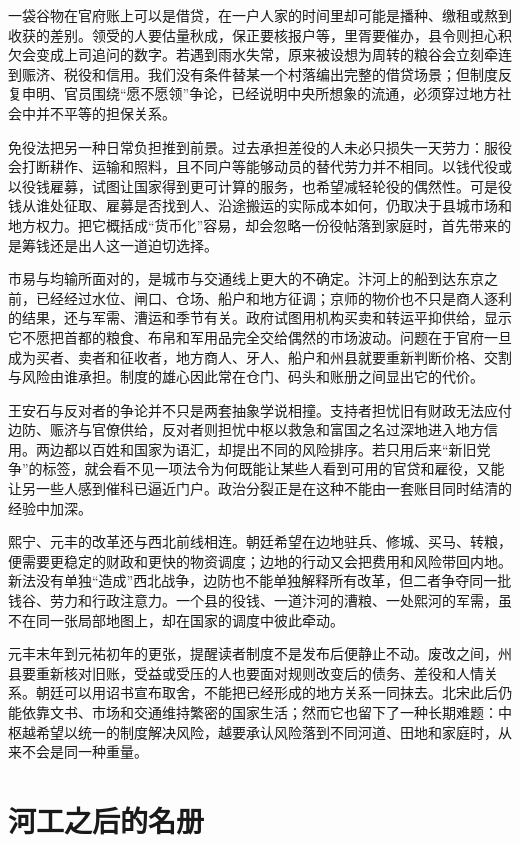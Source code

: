 一袋谷物在官府账上可以是借贷，在一户人家的时间里却可能是播种、缴租或熬到收获的差别。领受的人要估量秋成，保正要核报户等，里胥要催办，县令则担心积欠会变成上司追问的数字。若遇到雨水失常，原来被设想为周转的粮谷会立刻牵连到赈济、税役和信用。我们没有条件替某一个村落编出完整的借贷场景；但制度反复申明、官员围绕“愿不愿领”争论，已经说明中央所想象的流通，必须穿过地方社会中并不平等的担保关系。

免役法把另一种日常负担推到前景。过去承担差役的人未必只损失一天劳力：服役会打断耕作、运输和照料，且不同户等能够动员的替代劳力并不相同。以钱代役或以役钱雇募，试图让国家得到更可计算的服务，也希望减轻轮役的偶然性。可是役钱从谁处征取、雇募是否找到人、沿途搬运的实际成本如何，仍取决于县城市场和地方权力。把它概括成“货币化”容易，却会忽略一份役帖落到家庭时，首先带来的是筹钱还是出人这一道迫切选择。

市易与均输所面对的，是城市与交通线上更大的不确定。汴河上的船到达东京之前，已经经过水位、闸口、仓场、船户和地方征调；京师的物价也不只是商人逐利的结果，还与军需、漕运和季节有关。政府试图用机构买卖和转运平抑供给，显示它不愿把首都的粮食、布帛和军用品完全交给偶然的市场波动。问题在于官府一旦成为买者、卖者和征收者，地方商人、牙人、船户和州县就要重新判断价格、交割与风险由谁承担。制度的雄心因此常在仓门、码头和账册之间显出它的代价。

王安石与反对者的争论并不只是两套抽象学说相撞。支持者担忧旧有财政无法应付边防、赈济与官僚供给，反对者则担忧中枢以救急和富国之名过深地进入地方信用。两边都以百姓和国家为语汇，却提出不同的风险排序。若只用后来“新旧党争”的标签，就会看不见一项法令为何既能让某些人看到可用的官贷和雇役，又能让另一些人感到催科已逼近门户。政治分裂正是在这种不能由一套账目同时结清的经验中加深。

熙宁、元丰的改革还与西北前线相连。朝廷希望在边地驻兵、修城、买马、转粮，便需要更稳定的财政和更快的物资调度；边地的行动又会把费用和风险带回内地。新法没有单独“造成”西北战争，边防也不能单独解释所有改革，但二者争夺同一批钱谷、劳力和行政注意力。一个县的役钱、一道汴河的漕粮、一处熙河的军需，虽不在同一张局部地图上，却在国家的调度中彼此牵动。

元丰末年到元祐初年的更张，提醒读者制度不是发布后便静止不动。废改之间，州县要重新核对旧账，受益或受压的人也要面对规则改变后的债务、差役和人情关系。朝廷可以用诏书宣布取舍，不能把已经形成的地方关系一同抹去。北宋此后仍能依靠文书、市场和交通维持繁密的国家生活；然而它也留下了一种长期难题：中枢越希望以统一的制度解决风险，越要承认风险落到不同河道、田地和家庭时，从来不会是同一种重量。

\section{河工之后的名册}

